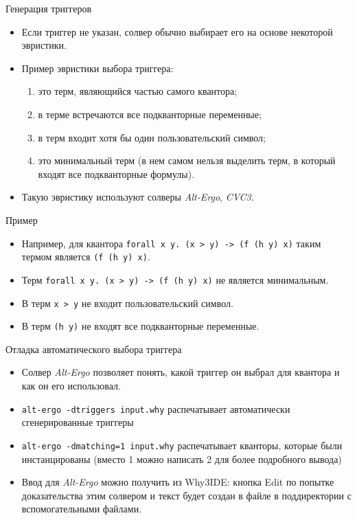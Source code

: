 \documentclass[hyperref={unicode=true}]{beamer}
\begin{document}
    \begin{frame}{Генерация триггеров}
    \begin{itemize}
    \item
    Если триггер не указан, солвер обычно выбирает его на основе
    некоторой эвристики.
    \item
    Пример эвристики выбора триггера:
        \begin{enumerate}
        \item это терм, являющийся частью самого квантора;
        \item в терме встречаются все подкванторные переменные;
        \item в терм входит хотя бы один пользовательский символ;
        \item это минимальный терм (в нем самом нельзя выделить
                терм, в который входят все подкванторные формулы).
        \end{enumerate}
    \item
    Такую эвристику используют солверы \textsl{Alt-Ergo}, \textsl{CVC3}.
    \end{itemize}
    \end{frame}

    \begin{frame}{Пример}
    \begin{itemize}
    \item Например, для квантора \texttt{forall x y. (x > y) -> (f (h y) x)}
    таким термом является \texttt{(f (h y) x)}.
    \item Терм \texttt{forall x y. (x > y) -> (f (h y) x)} не является
    минимальным.
    \item В терм \texttt{x > y} не входит пользовательский символ.
    \item В терм \texttt{(h y)} не входят все подкванторные переменные.
    \end{itemize}
    \end{frame}

    \begin{frame}{Отладка автоматического выбора триггера}
    \begin{itemize}
    \item
    Солвер \textsl{Alt-Ergo} позволяет понять, какой триггер он выбрал
    для квантора и как он его использовал.
    \item
    \texttt{alt-ergo -dtriggers input.why} распечатывает
    автоматически сгенерированные триггеры
    \item
    \texttt{alt-ergo -dmatching=1 input.why} распечатывает
    кванторы, которые были инстанцированы (вместо 1 можно написать 2 для
            более подробного вывода)
    \item
    Ввод для \textsl{Alt-Ergo} можно получить из Why3IDE: кнопка Edit
    по попытке доказательства этим солвером и текст будет создан в файле
    в поддиректории с вспомогательными файлами.
    \end{itemize}
    \end{frame}
\end{document}

